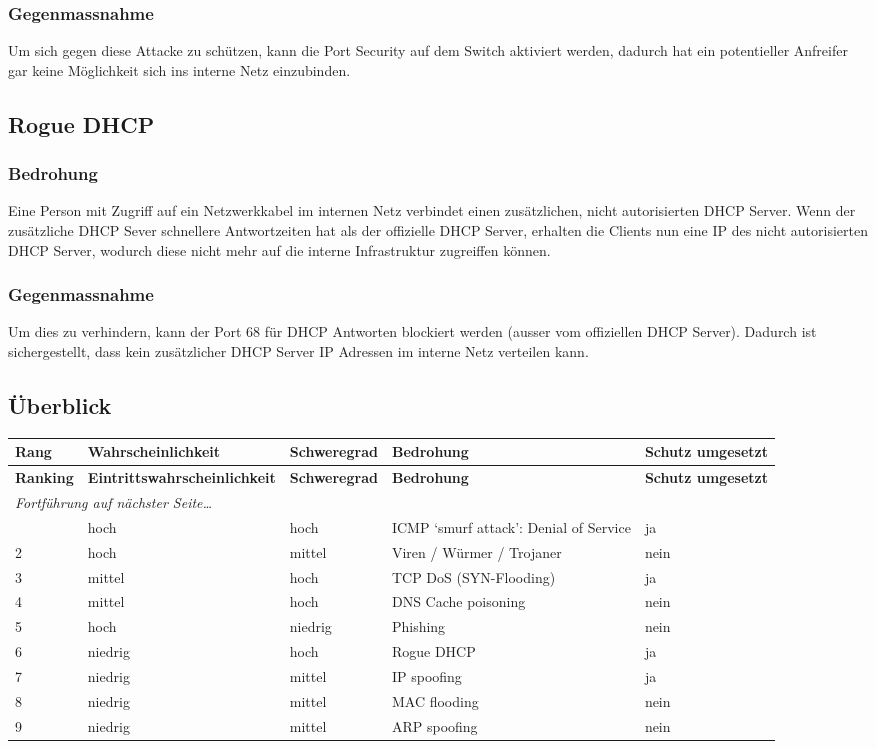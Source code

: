 \documentclass[11pt,a4paper,parskip=half]{scrartcl}
\begin{document}
\subsubsection{Gegenmassnahme}
Um sich gegen diese Attacke zu schützen, kann die Port Security auf dem Switch aktiviert werden, dadurch hat ein potentieller Anfreifer gar keine Möglichkeit sich ins interne Netz einzubinden.

\subsection{Rogue DHCP}
\subsubsection{Bedrohung}
Eine Person mit Zugriff auf ein Netzwerkkabel im internen Netz verbindet einen zusätzlichen, nicht autorisierten DHCP Server. Wenn der zusätzliche DHCP Sever schnellere Antwortzeiten hat als der offizielle DHCP Server, erhalten die Clients nun eine IP des nicht autorisierten DHCP Server, wodurch diese nicht mehr auf die interne Infrastruktur zugreiffen können.
\subsubsection{Gegenmassnahme}
Um dies zu verhindern, kann der Port 68 für DHCP Antworten blockiert werden (ausser vom offiziellen DHCP Server). Dadurch ist sichergestellt, dass kein zusätzlicher DHCP Server IP Adressen im interne Netz verteilen kann.

\subsection{Überblick}
\begin{longtable}{p{1.4cm}|p{3.9cm}|p{2.6cm}|p{4cm}|p{2cm}}
	\textbf{Rang} & \textbf{Wahrscheinlichkeit} & \textbf{Schweregrad} & \textbf{Bedrohung} & \textbf{Schutz umgesetzt}\\
	\hline
	\endfirsthead
	\textbf{Ranking} & \textbf{Eintrittswahrscheinlichkeit} & \textbf{Schweregrad} & \textbf{Bedrohung} & \textbf{Schutz umgesetzt}\\
	\hline
	\endhead
	\hline
	\multicolumn{2}{l}{\textit{Fortführung auf nächster Seite\ldots}} \\
	\endfoot
	\endlastfoot
	1 & hoch & hoch & ICMP ‘smurf attack’: Denial of Service & ja\\
	2 & hoch & mittel & Viren / Würmer / Trojaner & nein\\
	3 & mittel & hoch & TCP DoS (SYN-Flooding) & ja\\
	4 & mittel & hoch & DNS Cache poisoning & nein\\
	5 & hoch & niedrig & Phishing & nein\\
	6 & niedrig & hoch & Rogue DHCP & ja\\
	7 & niedrig & mittel & IP spoofing & ja\\
	8 & niedrig & mittel & MAC flooding & nein\\
	9 & niedrig & mittel & ARP spoofing & nein\\
\end{longtable}
\end{document}
